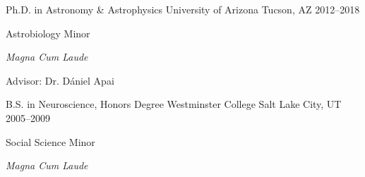 

\begin{cventries}

  \cventry
    {Ph.D. in Astronomy \& Astrophysics} %
    {University of Arizona} %
    {Tucson, AZ} %
    {2012--2018} %
    {
      \begin{cvitems} %
        \item {Astrobiology Minor}
        \item {\textit{Magna Cum Laude}}
        \item {Advisor: Dr. D\'aniel Apai}
      \end{cvitems}
    }

  \cventry
    {B.S. in Neuroscience, Honors Degree} %
    {Westminster College} %
    {Salt Lake City, UT} %
    {2005--2009} %
    {
      \begin{cvitems} %
        \item {Social Science Minor}
        \item {\textit{Magna Cum Laude}}
      \end{cvitems}
    }

\end{cventries}
